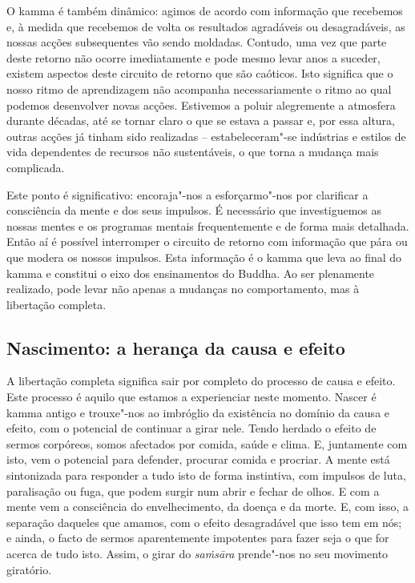 O kamma é também dinâmico: agimos de acordo com informação que recebemos e, à
medida que recebemos de volta os resultados agradáveis ou desagradáveis, as
nossas acções subsequentes vão sendo moldadas. Contudo, uma vez que parte deste
retorno não ocorre imediatamente e pode mesmo levar anos a suceder, existem
aspectos deste circuito de retorno que são caóticos. Isto significa que o nosso
ritmo de aprendizagem não acompanha necessariamente o ritmo ao qual podemos
desenvolver novas acções. Estivemos a poluir alegremente a atmosfera durante
décadas, até se tornar claro o que se estava a passar e, por essa altura, outras
acções já tinham sido realizadas -- estabeleceram"-se indústrias e estilos de
vida dependentes de recursos não sustentáveis, o que torna a mudança mais
complicada.

Este ponto é significativo: encoraja"-nos a esforçarmo"-nos por clarificar a
consciência da mente e dos seus impulsos. É necessário que investiguemos as
nossas mentes e os programas mentais frequentemente e de forma mais detalhada.
Então aí é possível interromper o circuito de retorno com informação que pára ou
que modera os nossos impulsos. Esta informação é o kamma que leva ao final do
kamma e constitui o eixo dos ensinamentos do Buddha.
Ao ser plenamente realizado, pode levar não apenas a mudanças no
comportamento, mas à libertação completa.

\subsection{Nascimento: a herança da causa e efeito}

A libertação completa significa sair por completo do processo de causa e efeito.
Este processo é aquilo que estamos a experienciar neste momento. Nascer é kamma
antigo e trouxe"-nos ao imbróglio da existência no domínio da causa e efeito, com
o potencial de continuar a girar nele. Tendo herdado o efeito de sermos
corpóreos, somos afectados por comida, saúde e clima. E, juntamente com isto,
vem o potencial para defender, procurar comida e procriar. A mente está
sintonizada para responder a tudo isto de forma instintiva, com impulsos de
luta, paralisação ou fuga, que podem surgir num abrir e fechar de olhos. E com a
mente vem a consciência do envelhecimento, da doença e da morte. E, com isso, a
separação daqueles que amamos, com o efeito desagradável que isso tem em nós; e
ainda, o facto de sermos aparentemente impotentes para fazer seja o que for
acerca de tudo isto. Assim, o girar do \emph{saṁsāra} prende"-nos no seu
movimento giratório.

